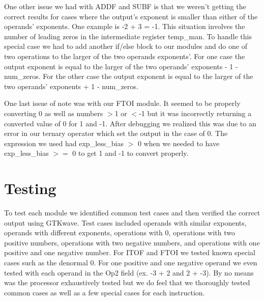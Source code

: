 \documentclass{article}
\begin{document}
\begin{multicols}{2}
One other issue we had with ADDF and SUBF is that we weren't getting the correct results for cases where the output's exponent is smaller than either of the operands' exponents. One example is -2 + 3 = -1. This situation involves the number of leading zeros in the intermediate register temp\_man. To handle this special case we had to add another if/else block to our modules and do one of two operations to the larger of the two operands exponents'. For one case the output exponent is equal to the larger of the two operands' exponents - 1 - num\_zeros. For the other case the output exponent is equal to the larger of the two operands' exponents + 1 - num\_zeros.

One last issue of note was with our FTOI module. It seemed to be properly converting 0 as well as numbers $>$1 or $<$-1 but it was incorrectly returning a converted value of 0 for 1 and -1. After debugging we realized this was due to an error in our ternary operator which set the output in the case of 0. The expression we used had exp\_less\_bias $>$ 0 when we needed to have exp\_less\_bias $>=$ 0 to get 1 and -1 to convert properly.
  
  \section{Testing}
To test each module we identified common test cases and then verified the correct output using GTKwave. Test cases included operands with similar exponents, operands with different exponents, operations with 0, operations with two positive numbers, operations with two negative numbers, and operations with one positive and one negative number. For ITOF and FTOI we tested known special cases such as the denormal 0. For one positive and one negative operand we even tested with each operand in the Op2 field (ex. -3 + 2 and 2 + -3). By no means was the processor exhaustively tested but we do feel that we thoroughly tested common cases as well as a few special cases for each instruction.

  
\end{multicols}
\end{document}
